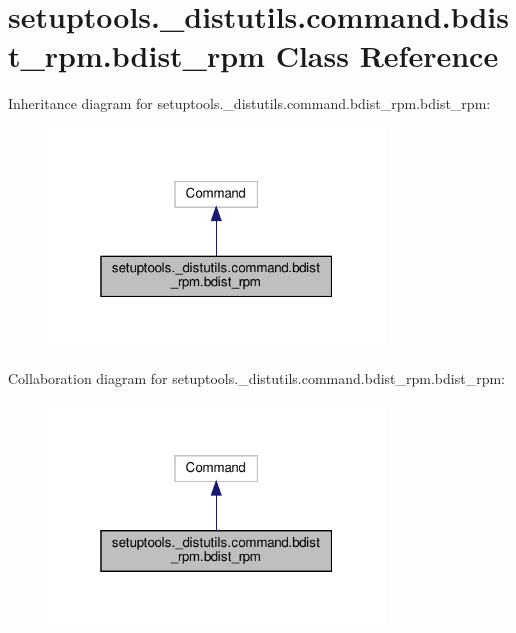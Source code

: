 \hypertarget{classsetuptools_1_1__distutils_1_1command_1_1bdist__rpm_1_1bdist__rpm}{}\section{setuptools.\+\_\+distutils.\+command.\+bdist\+\_\+rpm.\+bdist\+\_\+rpm Class Reference}
\label{classsetuptools_1_1__distutils_1_1command_1_1bdist__rpm_1_1bdist__rpm}


Inheritance diagram for setuptools.\+\_\+distutils.\+command.\+bdist\+\_\+rpm.\+bdist\+\_\+rpm\+:
\nopagebreak
\begin{figure}[H]
\begin{center}
\leavevmode
\includegraphics[width=253pt]{classsetuptools_1_1__distutils_1_1command_1_1bdist__rpm_1_1bdist__rpm__inherit__graph}
\end{center}
\end{figure}


Collaboration diagram for setuptools.\+\_\+distutils.\+command.\+bdist\+\_\+rpm.\+bdist\+\_\+rpm\+:
\nopagebreak
\begin{figure}[H]
\begin{center}
\leavevmode
\includegraphics[width=253pt]{classsetuptools_1_1__distutils_1_1command_1_1bdist__rpm_1_1bdist__rpm__coll__graph}
\end{center}
\end{figure}
